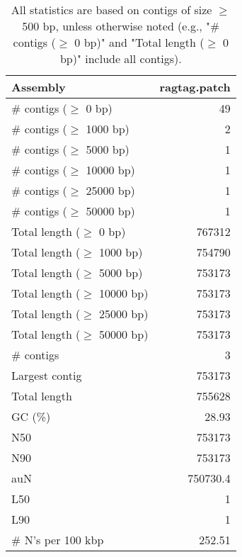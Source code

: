 \documentclass[12pt,a4paper]{article}
\begin{document}
\begin{table}[ht]
\begin{center}
\caption{All statistics are based on contigs of size $\geq$ 500 bp, unless otherwise noted (e.g., "\# contigs ($\geq$ 0 bp)" and "Total length ($\geq$ 0 bp)" include all contigs).}
\begin{tabular}{|l*{1}{|r}|}
\hline
Assembly & ragtag.patch \\ \hline
\# contigs ($\geq$ 0 bp) & 49 \\ \hline
\# contigs ($\geq$ 1000 bp) & 2 \\ \hline
\# contigs ($\geq$ 5000 bp) & 1 \\ \hline
\# contigs ($\geq$ 10000 bp) & 1 \\ \hline
\# contigs ($\geq$ 25000 bp) & 1 \\ \hline
\# contigs ($\geq$ 50000 bp) & 1 \\ \hline
Total length ($\geq$ 0 bp) & 767312 \\ \hline
Total length ($\geq$ 1000 bp) & 754790 \\ \hline
Total length ($\geq$ 5000 bp) & 753173 \\ \hline
Total length ($\geq$ 10000 bp) & 753173 \\ \hline
Total length ($\geq$ 25000 bp) & 753173 \\ \hline
Total length ($\geq$ 50000 bp) & 753173 \\ \hline
\# contigs & 3 \\ \hline
Largest contig & 753173 \\ \hline
Total length & 755628 \\ \hline
GC (\%) & 28.93 \\ \hline
N50 & 753173 \\ \hline
N90 & 753173 \\ \hline
auN & 750730.4 \\ \hline
L50 & 1 \\ \hline
L90 & 1 \\ \hline
\# N's per 100 kbp & 252.51 \\ \hline
\end{tabular}
\end{center}
\end{table}
\end{document}
